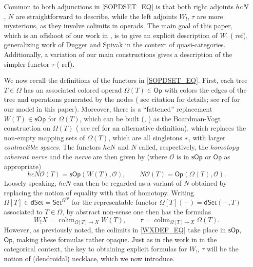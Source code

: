 \documentclass[a4paper,10pt
,draft
]{article}%
\numberwithin{equation}{section}
\numberwithin{figure}{section}
\theoremstyle{definition} %
\newcommand{\Op}{\mathsf{Op}}%
\newcommand{\sOp}{\ensuremath{\mathsf{sOp}}}%
\DeclareMathOperator{\colim}{colim}%
\renewcommand{\O}{\ensuremath{\mathcal O}}
\newcommand{\1}{\ensuremath{\mathbbm 1}}%
\begin{document}
Common to both adjunctions in \eqref{SOPDSET_EQ}
is that both right adjoints
$hcN$, $N$ are straightforward to describe, 
while the left adjoints $W_!$, $\tau$ are more mysterious,
as they involve colimits in operads.
The main goal of this paper, 
which is an offshoot of our work in \cite{BP_TAS},
is to give an explicit description of $W_!$
{(\color{red} ref)}, 
generalizing work of Dugger and Spivak \cite{DS11}
in the context of quasi-categories.
Additionally, a variation of our main constructions
gives a description of the simpler functor $\tau$
{(\color{red} ref)}.

We now recall the definitions of the functors in
\eqref{SOPDSET_EQ}.
First, each tree $T \in \Omega$
has an associated colored operad
$\Omega(T) \in \mathsf{Op}$
with colors the edges of the tree and 
operations generated by the nodes
{(\color{red} see citation for details;
	see ref for our model in this paper)}.
Moreover, there is a ``fattened'' replacement 
$W(T) \in \sOp$ for $\Omega(T)$,
which can be built 
(\cite[Rem. 7.3]{MW09}, \cite[Eq. (4.2.1)]{CM13b})
as the Boardman-Vogt construction on
$\Omega(T)$
{(\color{red} see ref for an alternative definition)},
which replaces the non-empty mapping sets of 
$\Omega(T)$, which are all singletons $\**$,
with larger \emph{contractible spaces}.
The functors $hcN$ and $N$ called, respectively,
the \emph{homotopy coherent nerve}
and the \emph{nerve}
are then given by (where $\O$ is in $\sOp$ or $\Op$ as appropriate)
\begin{equation}\label{TWONER EQ}
	hcN \O(T) = \sOp(W(T),\O),
	\qquad
	N \O(T) = \Op(\Omega(T),\O).
\end{equation}
Loosely speaking, $hcN$ can then be regarded as a variant of $N$
obtained by replacing the notion of equality with that of homotopy.
Writing 
$\Omega[T]\in \mathsf{dSet} = \mathsf{Set}^{\Omega^{op}}$
for the representable functor
$\Omega[T](-) = \mathsf{dSet}(-,T)$
associated to $T \in \Omega$,
by abstract non-sense one then has the formulas
\begin{equation}\label{WXDEF_EQ}
	W_!X = \colim_{\Omega[T] \to X} W(T),
\qquad
	\tau = \colim_{\Omega[T] \to X} \Omega(T).
\end{equation}
However, as previously noted, 
the colimits in \eqref{WXDEF_EQ}
take place in $\sOp$, $\Op$,
making these formulas rather opaque.
Just as in the work in \cite{DS11} in the categorical context,
the key to obtaining explicit formulas for
$W_!$, $\tau$ will be the notion of (dendroidal) necklace,
which we now introduce.
\end{document}
